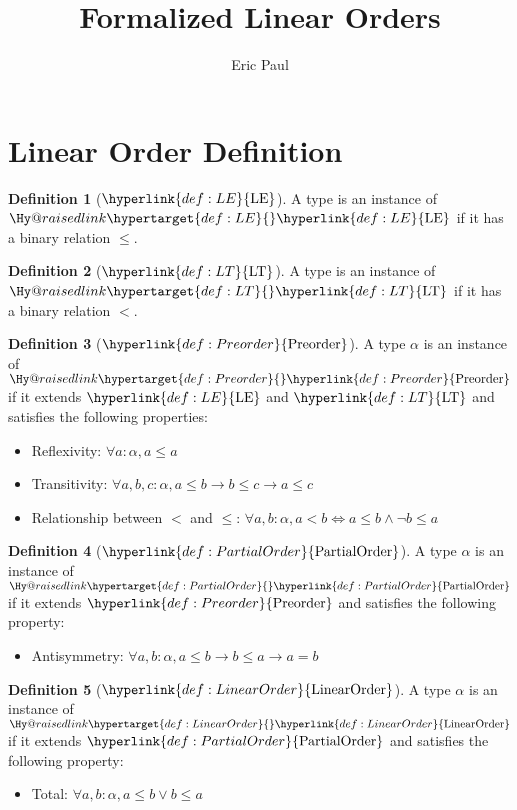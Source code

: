 \documentclass{article}
\title{Formalized Linear Orders}
\author{Eric Paul}
\date{}
\makeatletter
\newcommand\newlink[2]{{\protect\hyperlink{#1}{\normalcolor #2}}}
\newcommand\newtarget[2]{\Hy@raisedlink{\hypertarget{#1}{}}#2}
\theoremstyle{definition}
\newtheorem{definition}{Definition}
\makeatother
\begin{document}
\maketitle

\section*{Linear Order Definition}
\newcommand\LE{\newlink{def:LE}{\text{LE}}}
\begin{definition}[$\LE$]
A type is an instance of $\newtarget{def:LE}{\LE}$ if it has a binary relation $\le$.
\end{definition}

\newcommand\LT{\newlink{def:LT}{\text{LT}}}
\begin{definition}[$\LT$]
A type is an instance of $\newtarget{def:LT}{\LT}$ if it has a binary relation $<$.
\end{definition}

\newcommand\Preorder{\newlink{def:Preorder}{\text{Preorder}}}
\begin{definition}[$\Preorder$]
A type $\alpha$ is an instance of $\newtarget{def:Preorder}{\Preorder}$ if it extends $\LE$ and $\LT$ and satisfies the following properties:
\begin{itemize}
\item Reflexivity: $\forall a : \alpha, a \le a$
\item Transitivity: $\forall a,b,c : \alpha, a\le b \to b\le c \to a\le c$
\item Relationship between $<$ and $\le$: $\forall a,b : \alpha, a < b \iff a\le b \land \neg b \le a$
\end{itemize}
\end{definition}

\newcommand\PartialOrder{\newlink{def:PartialOrder}{\text{PartialOrder}}}
\begin{definition}[$\PartialOrder$]
A type $\alpha$ is an instance of $\newtarget{def:PartialOrder}{\PartialOrder}$ if it extends $\Preorder$ and satisfies the following property:
\begin{itemize}
\item Antisymmetry: $\forall a,b : \alpha, a\le b \to b\le a \to a = b$
\end{itemize}
\end{definition}

\newcommand\LinearOrder{\newlink{def:LinearOrder}{\text{LinearOrder}}}
\begin{definition}[$\LinearOrder$]
A type $\alpha$ is an instance of $\newtarget{def:LinearOrder}{\LinearOrder}$ if it extends $\PartialOrder$ and satisfies the following property:
\begin{itemize}
\item Total: $\forall a,b : \alpha, a\le b \lor b\le a$
\end{itemize}
\end{definition}
\end{document}
